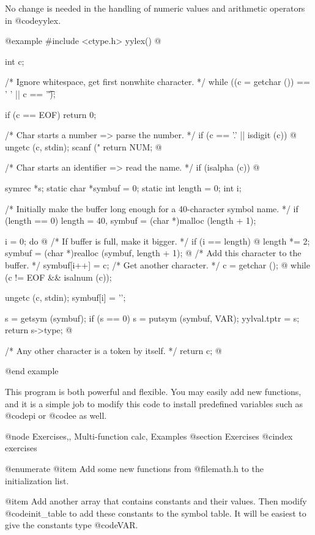{{{{{{{{{{{{{{No change is needed in the handling of numeric values and arithmetic
operators in @code{yylex}.

@example
#include <ctype.h>
yylex()
@{
  int c;

  /* Ignore whitespace, get first nonwhite character.  */
  while ((c = getchar ()) == ' ' || c == '\t');

  if (c == EOF)
    return 0;

  /* Char starts a number => parse the number.  */
  if (c == '.' || isdigit (c))
    @{
      ungetc (c, stdin);
      scanf ("%
      return NUM;
    @}

  /* Char starts an identifier => read the name.  */
  if (isalpha (c))
    @{
      symrec *s;
      static char *symbuf = 0;
      static int length = 0;
      int i;

      /* Initially make the buffer long enough
         for a 40-character symbol name.  */
      if (length == 0)
        length = 40, symbuf = (char *)malloc (length + 1);

      i = 0;
      do
        @{
          /* If buffer is full, make it bigger.  */
          if (i == length)
            @{
              length *= 2;
              symbuf = (char *)realloc (symbuf, length + 1);
            @}
          /* Add this character to the buffer.  */
          symbuf[i++] = c;
          /* Get another character.  */
          c = getchar ();
        @}
      while (c != EOF && isalnum (c));

      ungetc (c, stdin);
      symbuf[i] = '\0';

      s = getsym (symbuf);
      if (s == 0)
        s = putsym (symbuf, VAR);
      yylval.tptr = s;
      return s->type;
    @}

  /* Any other character is a token by itself.  */
  return c;
@}
@end example

This program is both powerful and flexible. You may easily add new
functions, and it is a simple job to modify this code to install predefined
variables such as @code{pi} or @code{e} as well.

@node Exercises,, Multi-function calc, Examples
@section Exercises
@cindex exercises

@enumerate
@item
Add some new functions from @file{math.h} to the initialization list.

@item
Add another array that contains constants and their values.  Then
modify @code{init_table} to add these constants to the symbol table.
It will be easiest to give the constants type @code{VAR}.

}}}}}}}}}}}}}}
